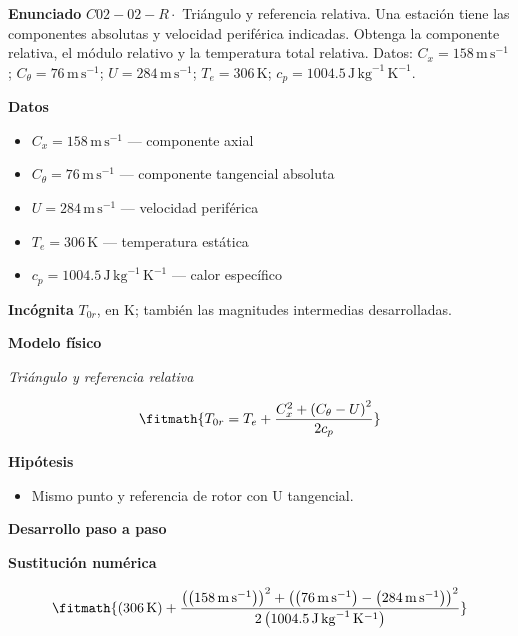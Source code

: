 \documentclass[10pt,openany]{book}
\begin{document}
\begin{tcolorbox}[title={Problema resuelto 2}, studiumworked, breakable]

\noindent\textbf{Enunciado}
\(C02-02-R \cdot\) Triángulo y referencia relativa. Una estación tiene las componentes absolutas y velocidad periférica indicadas. Obtenga la componente relativa, el módulo relativo y la temperatura total relativa. Datos: \(C_x=158\, \mathrm{m}\,\mathrm{s}^{-1}\); \(C_\theta=76\, \mathrm{m}\,\mathrm{s}^{-1}\); \(U=284\, \mathrm{m}\,\mathrm{s}^{-1}\); \(T_e=306\, \mathrm{K}\); \(c_p=1004.5\, \mathrm{J}\,\mathrm{kg}^{-1}\,\mathrm{K}^{-1}\).

\noindent\textbf{Datos}
\begin{itemize}
\item $C_x = 158\,\mathrm{m}\,\mathrm{s}^{-1}$ — componente axial
\item $C_\theta = 76\,\mathrm{m}\,\mathrm{s}^{-1}$ — componente tangencial absoluta
\item $U = 284\,\mathrm{m}\,\mathrm{s}^{-1}$ — velocidad periférica
\item $T_e = 306\,\mathrm{K}$ — temperatura estática
\item $c_p = 1004.5\,\mathrm{J}\,\mathrm{kg}^{-1}\,\mathrm{K}^{-1}$ — calor específico
\end{itemize}

\noindent\textbf{Incógnita}
$T_{0r}$, en $\mathrm{K}$; también las magnitudes intermedias desarrolladas.

\noindent\textbf{Modelo físico}

\noindent\textit{Triángulo y referencia relativa}

\[
\fitmath{T_{0r}=T_e + \frac{C_x^{2} + \left(C_\theta - U\right)^{2}}{2 c_p}}
\]

\noindent\textbf{Hipótesis}
\begin{itemize}
\item Mismo punto y referencia de rotor con U tangencial.
\end{itemize}

\noindent\textbf{Desarrollo paso a paso}



\noindent\textbf{Sustitución numérica}

\[
\fitmath{\left(306\,\mathrm{K}\right) + \frac{\left(\left(158\,\mathrm{m}\,\mathrm{s}^{-1}\right)\right)^{2} + \left(\left(76\,\mathrm{m}\,\mathrm{s}^{-1}\right) - \left(284\,\mathrm{m}\,\mathrm{s}^{-1}\right)\right)^{2}}{2 \left(1004.5\,\mathrm{J}\,\mathrm{kg}^{-1}\,\mathrm{K}^{-1}\right)}}
\]


\end{tcolorbox}
\end{document}
